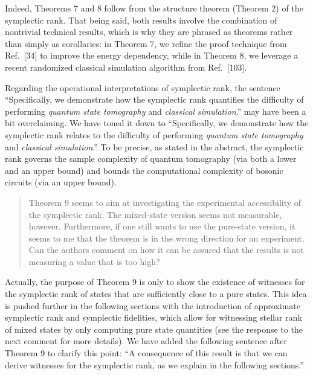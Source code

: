 \documentclass[a4paper,12pt]{article}
\newenvironment{Referee}[1]
{\noindent {\bf Comment #1:} \begin{quote} }
{\end{quote}\vspace{0 cm}}
\newenvironment{Response}
{\noindent \color{RawSienna}{\bf Response:} }
{\vspace{0.4 cm}}
\begin{document}
\begin{Response}
    Indeed, Theorems 7 and 8 follow from the structure theorem (Theorem 2) of the symplectic rank. That being said, both results involve the combination of nontrivial technical results, which is why they are phrased as theorems rather than simply as corollaries: in Theorem 7, we refine the proof technique from Ref.\ [34] to improve the energy dependency, while in Theorem 8, we leverage a recent randomized classical simulation algorithm from Ref.\ [103].

    Regarding the operational interpretations of symplectic rank, the sentence ``Specifically, we demonstrate how the symplectic rank quantifies the difficulty of performing \emph{quantum state tomography} and \emph{classical simulation}.'' may have been a bit overclaiming. We have toned it down to ``Specifically, we demonstrate how the symplectic rank relates to the difficulty of performing \emph{quantum state tomography} and \emph{classical simulation}.'' To be precise, as stated in the abstract, the symplectic rank governs the sample complexity of quantum tomography (via both a lower and an upper bound) and bounds the computational complexity of bosonic circuits (via an upper bound).
\end{Response}

\begin{Referee}{7}
Theorem 9 seems to aim at investigating the experimental accessibility of the symplectic rank. The mixed-state version seems not measurable, however. Furthermore, if one still wants to use the pure-state version, it seems to me that the theorem is in the wrong direction for an experiment. Can the authors comment on how it can be assured that the results is not measuring a value that is too high?
\end{Referee}

\begin{Response}
    Actually, the purpose of Theorem 9 is only to show the existence of witnesses for the symplectic rank of states that are sufficiently close to a pure states. This idea is pushed further in the following sections with the introduction of approximate symplectic rank and symplectic fidelities, which allow for witnessing stellar rank of mixed states by only computing pure state quantities (see the response to the next comment for more details). We have added the following sentence after Theorem 9 to clarify this point: ``A consequence of this result is that we can derive witnesses for the symplectic rank, as we explain in the following sections.''
\end{Response}
\end{document}
